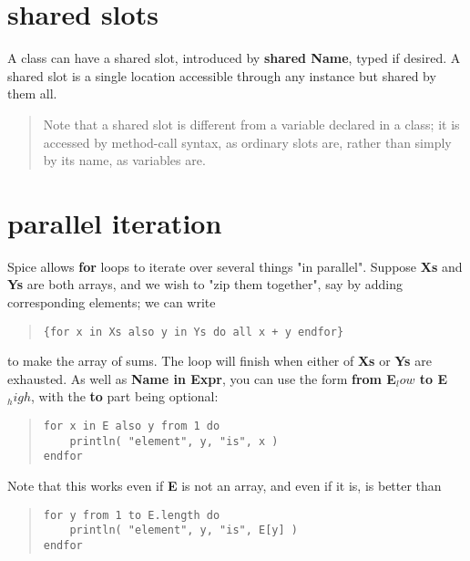 \documentclass{report}
\begin{document}
\section{shared slots}


A class can have a shared slot, introduced by {\bf shared Name}, typed if desired.
A shared slot is a single location accessible through any instance but shared
by them all.

\begin{quote}Note that a shared slot is different from a variable declared in a class;
it is accessed by method-call syntax, as ordinary slots are, rather than
simply by its name, as variables are.\end{quote}

\section{parallel iteration}


Spice allows {\bf for} loops to iterate over several things "in parallel".
Suppose {\bf Xs} and {\bf Ys} are both arrays, and we wish to "zip them together",
say by adding corresponding elements; we can write

\begin{quote}
\begin{verbatim}
{for x in Xs also y in Ys do all x + y endfor}
\end{verbatim}
\end{quote}


to make the array of sums. The loop will finish when either of {\bf Xs} or {\bf Ys}
are exhausted. As well as {\bf Name in Expr}, you can use the form {\bf from E$_ low$ to
E$_ high$}, with the {\bf to} part being optional:

\begin{quote}
\begin{verbatim}
for x in E also y from 1 do
    println( "element", y, "is", x )
endfor
\end{verbatim}
\end{quote}


Note that this works even if {\bf E} is not an array, and even if it is, is better
than

\begin{quote}
\begin{verbatim}
for y from 1 to E.length do
    println( "element", y, "is", E[y] )
endfor
\end{verbatim}
\end{quote}
\end{document}
